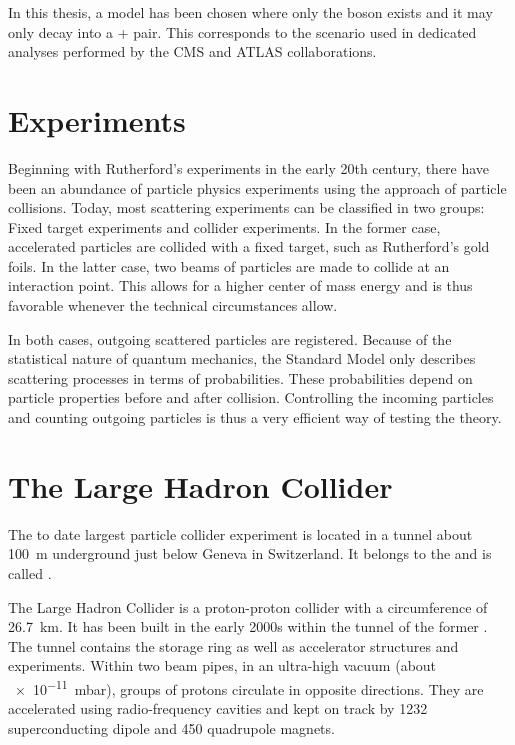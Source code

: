 In this thesis, a model has been chosen where only the \PWprime boson exists and it may only decay into a \Pqt + \Pqb pair. This corresponds to the scenario used in dedicated analyses performed by the \ac{CMS} and \ac{ATLAS} collaborations\cite{ATLASCollaboration:SearchWtb,CMSCollaboration:SearchesWbosons,CMS:CMS-PAS-B2G-17-010}.


\section{Experiments}
Beginning with Rutherford's experiments in the early 20th century, there have been an abundance of particle physics experiments using the approach of particle collisions. Today, most scattering experiments can be classified in two groups: Fixed target experiments and collider experiments. In the former case, accelerated particles are collided with a fixed target, such as Rutherford's gold foils. In the latter case, two beams of particles are made to collide at an interaction point. This allows for a higher center of mass energy and is thus favorable whenever the technical circumstances allow.

In both cases, outgoing scattered particles are registered. 
Because of the statistical nature of quantum mechanics, the Standard Model only describes scattering processes in terms of probabilities. These probabilities depend on particle properties before and after collision. 
Controlling the incoming particles and counting outgoing particles is thus a very efficient way of testing the theory.

\section{The Large Hadron Collider}
The to date largest particle collider experiment is located in a tunnel about \SI{100}{\m} underground just below Geneva in Switzerland. It belongs to the  and is called .

The Large Hadron Collider is a proton-proton collider with a circumference of \SI{26.7}{\km}. It has been built in the early 2000s within the tunnel of the former . The tunnel contains the storage ring as well as accelerator structures and experiments. Within two beam pipes, in an ultra-high vacuum (about \SI{e-11}{\milli\bar}), groups of protons circulate in opposite directions. They are accelerated using radio-frequency cavities and kept on track by \num{1232} superconducting dipole and \num{450} quadrupole magnets.

